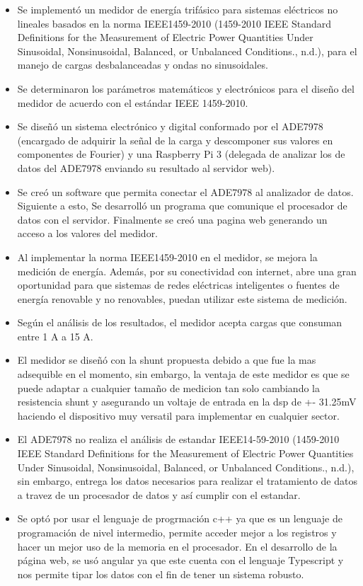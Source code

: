 \begin{itemize}
    \item Se implementó un medidor de energía trifásico para sistemas eléctricos no lineales basados en la norma IEEE1459-2010 (1459-2010 IEEE Standard Definitions for the Measurement of Electric Power Quantities Under Sinusoidal, Nonsinusoidal, Balanced, or Unbalanced Conditions., n.d.), para el manejo de cargas desbalanceadas y ondas no sinusoidales.
    \item Se determinaron los parámetros matemáticos y electrónicos para el diseño del medidor de acuerdo con el estándar IEEE 1459-2010.
    \item Se diseñó un sistema electrónico y digital conformado por el ADE7978 (encargado de adquirir la señal de la carga y descomponer sus valores en componentes de Fourier) y una Raspberry Pi 3 (delegada de analizar los de datos del ADE7978 enviando su resultado al servidor web).
    \item Se creó un software que permita conectar el ADE7978 al analizador de datos. Siguiente a esto, Se desarrolló un programa que comunique el procesador de datos con el servidor. Finalmente se creó una pagina web generando un acceso a los valores del medidor.
    \item Al implementar la norma IEEE1459-2010 en el medidor, se mejora la medición de energía. Además, por su conectividad con internet, abre una gran oportunidad para que sistemas de redes eléctricas inteligentes o fuentes de energía renovable y no renovables, puedan utilizar este sistema de medición.
    \item Según el análisis de los resultados, el medidor acepta cargas que consuman entre 1 A a 15 A.
    \item El medidor se diseñó con la shunt propuesta debido a que fue la mas adsequible en el momento, sin embargo, la ventaja de este medidor es que se puede adaptar a cualquier tamaño de medicion tan solo cambiando la resistencia shunt y asegurando un voltaje de entrada en la dsp de +- 31.25mV haciendo el dispositivo muy versatil para implementar en cualquier sector.
    \item El ADE7978 no realiza el análisis de estandar IEEE14-59-2010 (1459-2010 IEEE Standard Definitions for the Measurement of Electric Power Quantities Under Sinusoidal, Nonsinusoidal, Balanced, or Unbalanced Conditions., n.d.), sin embargo, entrega los datos necesarios para realizar el tratamiento de datos a travez de un procesador de datos y así cumplir con el estandar.
    \item Se optó por usar el lenguaje de progrmación c++ ya que es un lenguaje de programación de nivel intermedio, permite acceder mejor a los registros y hacer un mejor uso de la memoria en el procesador. En el desarrollo de la página web, se usó angular ya que este cuenta con el lenguaje Typescript y nos permite tipar los datos con el fin de tener un sistema robusto.

\end{itemize}

